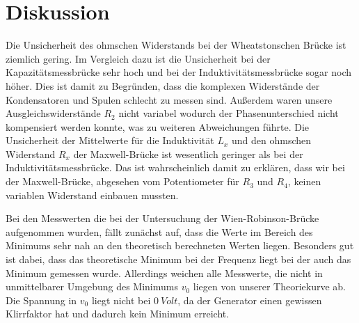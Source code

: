 \section{Diskussion}
\label{sec:Diskussion}
 

Die Unsicherheit des ohmschen Widerstands bei der Wheatstonschen Brücke ist ziemlich gering.
Im Vergleich dazu ist die Unsicherheit bei der Kapazitätsmessbrücke sehr hoch und bei der Induktivitätsmessbrücke sogar noch höher.
Dies ist damit zu Begründen, dass die komplexen Widerstände der Kondensatoren und Spulen schlecht zu messen sind.
Außerdem waren unsere Ausgleichswiderstände $R_2$ nicht variabel wodurch der Phasenunterschied nicht kompensiert werden konnte, was zu weiteren Abweichungen führte.
Die Unsicherheit der Mittelwerte für die Induktivität $L_x$ und den ohmschen Widerstand $R_x$ der Maxwell-Brücke ist wesentlich geringer als bei der Induktivitätsmessbrücke.
Das ist wahrscheinlich damit zu erklären, dass wir bei der Maxwell-Brücke, abgesehen vom Potentiometer für $R_3$ und $R_4$, keinen variablen Widerstand einbauen mussten.



Bei den Messwerten die bei der Untersuchung der Wien-Robinson-Brücke aufgenommen wurden, fällt zunächst auf, dass die Werte im Bereich des Minimums sehr nah an den theoretisch berechneten Werten liegen.
Besonders gut ist dabei, dass das theoretische Minimum bei der Frequenz liegt bei der auch das Minimum gemessen wurde.
Allerdings weichen alle Messwerte, die nicht in unmittelbarer Umgebung des Minimums $v_0$ liegen von unserer Theoriekurve ab.
Die Spannung in $v_0$ liegt nicht bei $\SI{0}{Volt}$, da der Generator einen gewissen Klirrfaktor hat und dadurch kein Minimum erreicht.
